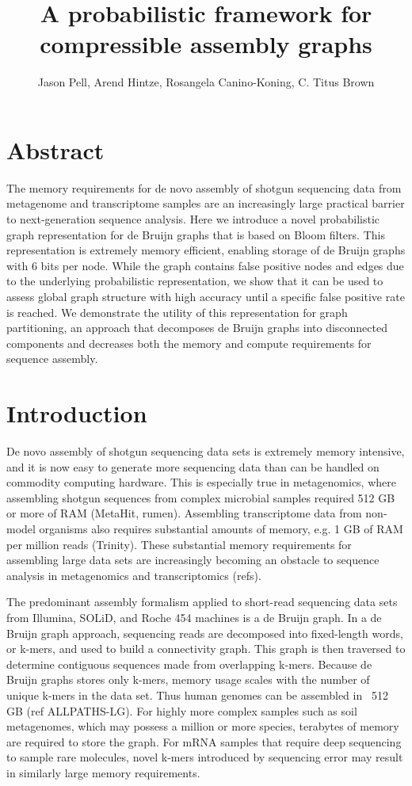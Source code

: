\documentclass[12pt]{article} \usepackage{simplemargins}
\begin{document}
\title{A probabilistic framework for compressible assembly graphs}
\author{Jason Pell, Arend Hintze, Rosangela Canino-Koning, C. Titus Brown}

\maketitle

\section{Abstract}

The memory requirements for de novo assembly of shotgun sequencing
data from metagenome and transcriptome samples are an increasingly
large practical barrier to next-generation sequence analysis.  Here we
introduce a novel probabilistic graph representation for de Bruijn
graphs that is based on Bloom filters.  This representation is
extremely memory efficient, enabling storage of de Bruijn graphs with
6 bits per node.  While the graph contains false positive nodes and
edges due to the underlying probabilistic representation, we show that
it can be used to assess global graph structure with high accuracy
until a specific false positive rate is reached.  We demonstrate the
utility of this representation for graph partitioning, an approach
that decomposes de Bruijn graphs into disconnected components and
decreases both the memory and compute requirements for sequence
assembly.

\section{Introduction}

De novo assembly of shotgun sequencing data sets is extremely memory
intensive, and it is now easy to generate more sequencing data than
can be handled on commodity computing hardware.  This is especially
true in metagenomics, where assembling shotgun sequences
from complex microbial samples required 512 GB or more of RAM
(MetaHit, rumen).  Assembling transcriptome data from non-model
organisms also requires substantial amounts of memory, e.g. 1 GB of
RAM per million reads (Trinity).  These substantial memory requirements for
assembling large data sets are increasingly becoming an obstacle to
sequence analysis in metagenomics and transcriptomics (refs).

The predominant assembly formalism applied to short-read sequencing
data sets from Illumina, SOLiD, and Roche 454 machines is a de Bruijn
graph.  In a de Bruijn graph approach, sequencing reads are decomposed
into fixed-length words, or k-mers, and used to build a connectivity
graph.  This graph is then traversed to determine contiguous sequences
made from overlapping k-mers.  Because de Bruijn graphs stores only
k-mers, memory usage scales with the number of unique k-mers in the
data set.  Thus human genomes can be assembled in ~512 GB (ref
ALLPATHS-LG).  For highly more complex samples such as soil
metagenomes, which may possess a million or more species, terabytes of
memory are required to store the graph.  For mRNA samples that require
deep sequencing to sample rare molecules, novel k-mers introduced by
sequencing error may result in similarly large memory requirements.
\end{document}
